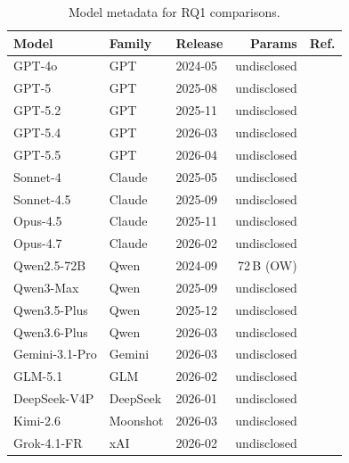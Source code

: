 \begin{table}[!htbp]
  \centering
  \caption{Model metadata for RQ1 comparisons.}
  \label{tab:model-release}
  \scriptsize
  \setlength{\tabcolsep}{2pt}
  \renewcommand{\arraystretch}{1.05}
  \begin{tabular}{@{}l l l r l@{}}
    \toprule
    \textbf{Model} & \textbf{Family} & \textbf{Release} & \textbf{Params} & \textbf{Ref.} \\
    \midrule
    GPT-4o          & GPT    & 2024-05 & undisclosed & \citep{openai_gpt4o_system_card} \\
    GPT-5           & GPT    & 2025-08 & undisclosed & \citep{openai_gpt5} \\
    GPT-5.2         & GPT    & 2025-11 & undisclosed & \citep{openai_gpt52_system_card} \\
    GPT-5.4         & GPT    & 2026-03 & undisclosed & \citep{openai_gpt54} \\
    GPT-5.5         & GPT    & 2026-04 & undisclosed & \citep{openai_gpt55} \\
    \midrule
    Sonnet-4        & Claude & 2025-05 & undisclosed & \citep{anthropic_claude4_system_card} \\
    Sonnet-4.5      & Claude & 2025-09 & undisclosed & \citep{anthropic_sonnet45} \\
    Opus-4.5        & Claude & 2025-11 & undisclosed & \citep{anthropic_opus45} \\
    Opus-4.7        & Claude & 2026-02 & undisclosed & \citep{anthropic_opus47} \\
    \midrule
    Qwen2.5-72B     & Qwen   & 2024-09 & 72\,B (OW)  & \citep{qwen25_technical_report} \\
    Qwen3-Max       & Qwen   & 2025-09 & undisclosed & \citep{qwen3max} \\
    Qwen3.5-Plus    & Qwen   & 2025-12 & undisclosed & \citep{qwen35_plus} \\
    Qwen3.6-Plus    & Qwen   & 2026-03 & undisclosed & \citep{qwen36_plus} \\
    \midrule
    Gemini-3.1-Pro  & Gemini & 2026-03 & undisclosed & \citep{google_gemini31_pro} \\
    GLM-5.1         & GLM    & 2026-02 & undisclosed & \citep{zhipu_glm51} \\
    DeepSeek-V4P    & DeepSeek & 2026-01 & undisclosed & \citep{deepseek_v4_pro} \\
    Kimi-2.6        & Moonshot & 2026-03 & undisclosed & \citep{moonshot_kimi_k26} \\
    Grok-4.1-FR     & xAI    & 2026-02 & undisclosed & \citep{xai_grok41_fast_reasoning} \\
    \bottomrule
  \end{tabular}
\end{table}
\FloatBarrier
